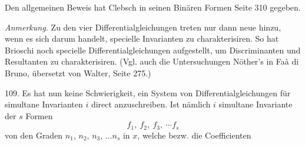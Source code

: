 \indent Den allgemeinen Beweis hat Clebsch in seinen \glqq Binären Formen\grqq{}
Seite 310 gegeben.

\textit{Anmerkung.} Zu den vier Differentialgleichungen treten nur dann
neue hinzu, wenn es sich darum handelt, specielle Invarianten zu
charakterisiren. So hat Brioschi noch specielle Differentialgleichungen
aufgestellt, um Discriminanten und Resultanten zu charakterisiren.
(Vgl. auch die Untersuchungen Nöther's in Faà di Bruno, übersetzt
von Walter, Seite 275.)

109.  Es hat nun keine Schwierigkeit, ein System von Differentialgleichungen
 für simultane Invarianten $i$ direct anzuschreiben. Ist
nämlich $i$ simultane Invariante der $s$ Formen
\[
f_1,\ f_2,\ f_3,\ \cdots f_s
\]
von den Graden $n_1$, $n_2$, $n_3$, $\ldots n_s$ in $x$, welche bezw. die Coefficienten


